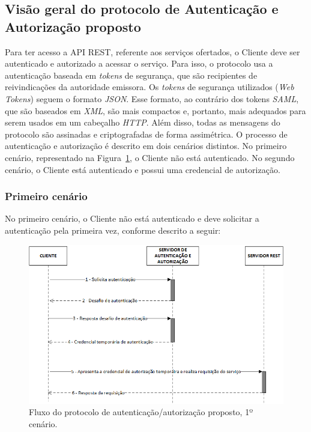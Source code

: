 \subsection{Visão geral do protocolo de Autenticação e Autorização proposto}

Para ter acesso a API REST, referente aos serviços ofertados, o Cliente deve ser autenticado e autorizado a acessar o serviço. Para isso, o protocolo usa a autenticação baseada em \emph{tokens} de segurança, que são recipientes de reivindicações da autoridade emissora. Os \emph{tokens} de segurança utilizados (\emph{Web Tokens}) seguem o formato \emph{JSON}. Esse formato, ao contrário dos tokens \emph{SAML}, que são baseados em \emph{XML}, são mais compactos e, portanto, mais adequados para serem usados em um cabeçalho \emph{HTTP}. Além disso, todas as mensagens do protocolo são assinadas e criptografadas de forma assimétrica. O processo de autenticação e autorização é descrito em dois cenários distintos. No primeiro cenário, representado na Figura~\ref{fig:protocoloseguro}, o Cliente não está autenticado. No segundo cenário, o Cliente está autenticado e possui uma credencial de autorização. %

\subsubsection{Primeiro cenário}

No primeiro cenário, o Cliente não está autenticado e deve solicitar a autenticação pela primeira vez, conforme descrito a seguir:

\begin{figure}[!htb]
    \centering
    \includegraphics[width=1.0\textwidth]{fluxo_autenticacao.png}
    \caption{Fluxo do protocolo de autenticação/autorização proposto, 1º cenário.}
    \label{fig:protocoloseguro}
\end{figure}


